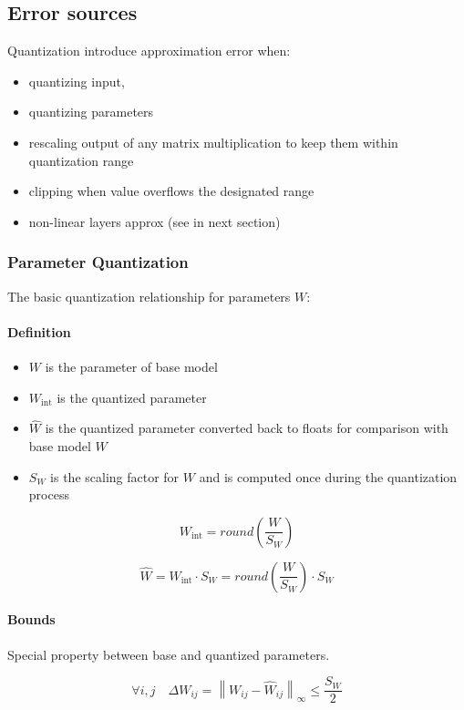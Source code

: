 \documentclass[11pt, a4paper]{article}
\newcommand{\norm}[1]{\left\|#1\right\|}
\newcommand{\Wint}{W_{\text{int}}}
\newcommand{\What}{\hat{W}}
\newcommand{\SW}{S_W}
\newcommand{\DeltaW}{\Delta W}
\begin{document}
\subsection{Error sources}

Quantization introduce approximation error when:
\begin{itemize}
    \item quantizing input,
    \item quantizing parameters
    \item rescaling output of any matrix multiplication to keep them within quantization range
    \item clipping when value overflows the designated range
    \item non-linear layers approx (see in next section)
\end{itemize}

\subsubsection{Parameter Quantization}
The basic quantization relationship for parameters $W$:

\paragraph{Definition}
\begin{itemize}
    \item $W$ is the parameter of base model
    \item $\Wint$ is the quantized parameter
    \item $\What$ is the quantized parameter converted back to floats for comparison with base model $W$
    \item $\SW$ is the scaling factor for $W$ and is computed once during the quantization process
\end{itemize}

$$    \Wint = round\!\left(\frac{W}{\SW}\right)$$

$$
    \What = \Wint \cdot \SW = round\!\left(\frac{W}{\SW}\right) \cdot \SW
$$

\paragraph{Bounds}

Special property between base and quantized parameters.

\begin{equation}
 \forall i,j \quad \DeltaW_{ij} = \norm{W_{ij} - \What_{ij}}_{\infty}
\leq \frac{\SW}{2}
\end{equation}
\end{document}
